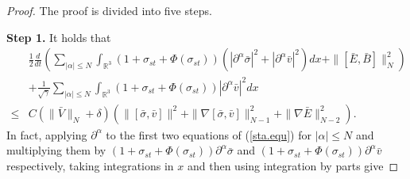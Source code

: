 \documentclass[11pt]{amsart}
\numberwithin{equation}{section}
\begin{document}
\begin{proof}
The proof is divided into five steps.

\medskip
 \textbf{ Step 1.} It holds that
\begin{equation}\label{3.3}
\begin{aligned}
&\frac{1}{2}\frac{d}{dt}\left(\sum_{|\alpha|\leq
N}\int_{\mathbb{R}^3}(1+\sigma_{st}+\Phi(\sigma_{st}))
(|\partial^{\alpha}\bar{\sigma}|^2+|\partial^{\alpha}\bar{v}|^2)dx+\|[\bar{E},\bar{B}]\|_{N}^{2}\right)\\
&+\frac{1}{\sqrt{\gamma}}\sum_{|\alpha|\leq
N}\int_{\mathbb{R}^3}(1+\sigma_{st}+\Phi(\sigma_{st}))|\partial^{\alpha}\bar{v}|^{2}dx\\
\leq &
C(\|\bar{V}\|_{N}+\delta)(\|[\bar{\sigma},\bar{v}]\|^{2}+\|\nabla[\bar{\sigma},\bar{v}]\|_{N-1}^{2}
 +\|\nabla \bar{E}\|_{N-2}^2).
 \end{aligned}
\end{equation}
In fact, applying $\partial^{\alpha}$ to the first two equations of
(\ref{sta.equ}) for $|\alpha|\leq N$ and multiplying them by
$(1+\sigma_{st}+\Phi(\sigma_{st}))\partial^{\alpha}\bar{\sigma}$ and
$(1+\sigma_{st}+\Phi(\sigma_{st}))\partial^{\alpha}\bar{v}$
respectively, taking integrations in $x$ and then using integration
by parts give


\end{proof}
\end{document}
